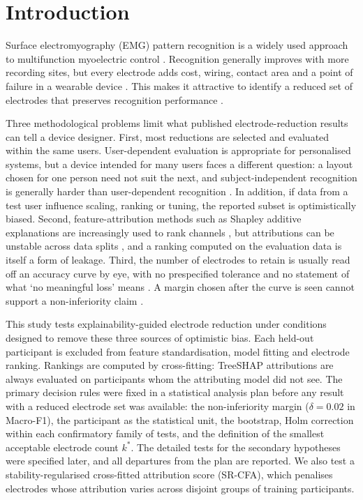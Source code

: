 \section{Introduction}
\label{sec:introduction}

Surface electromyography (EMG) pattern recognition is a widely used approach to multifunction myoelectric control \citep{hudgins1993new,englehart2003robust,scheme2011electromyogram,farina2014extraction}. Recognition generally improves with more recording sites, but every electrode adds cost, wiring, contact area and a point of failure in a wearable device \citep{vujaklija2016new}. This makes it attractive to identify a reduced set of electrodes that preserves recognition performance \citep{phinyomark2012feature,liu2014emg,altimemy2013classification,stango2015spatial,qu2021reduce}.

Three methodological problems limit what published electrode-reduction results can tell a device designer. First, most reductions are selected and evaluated within the same users. User-dependent evaluation is appropriate for personalised systems, but a device intended for many users faces a different question: a layout chosen for one person need not suit the next, and subject-independent recognition is generally harder than user-dependent recognition \citep{phinyomark2018emg,cote2019deep}. In addition, if data from a test user influence scaling, ranking or tuning, the reported subset is optimistically biased. Second, feature-attribution methods such as Shapley additive explanations \citep{lundberg2017unified,lundberg2020local} are increasingly used to rank channels \citep{salmi2025shapaad}, but attributions can be unstable across data splits \citep{visani2022statistical,kelodjou2023shaping,xiang2026roshap}, and a ranking computed on the evaluation data is itself a form of leakage. Third, the number of electrodes to retain is usually read off an accuracy curve by eye, with no prespecified tolerance and no statement of what `no meaningful loss' means \citep{schuirmann1987comparison,walker2011understanding}. A margin chosen after the curve is seen cannot support a non-inferiority claim \citep{campbell2018noninferiority}.

This study tests explainability-guided electrode reduction under conditions designed to remove these three sources of optimistic bias. Each held-out participant is excluded from feature standardisation, model fitting and electrode ranking. Rankings are computed by cross-fitting: TreeSHAP attributions are always evaluated on participants whom the attributing model did not see. The primary decision rules were fixed in a statistical analysis plan before any result with a reduced electrode set was available: the non-inferiority margin ($\delta = 0.02$ in Macro-F1), the participant as the statistical unit, the bootstrap, Holm correction within each confirmatory family of tests, and the definition of the smallest acceptable electrode count $k^*$. The detailed tests for the secondary hypotheses were specified later, and all departures from the plan are reported. We also test a stability-regularised cross-fitted attribution score (SR-CFA), which penalises electrodes whose attribution varies across disjoint groups of training participants.

